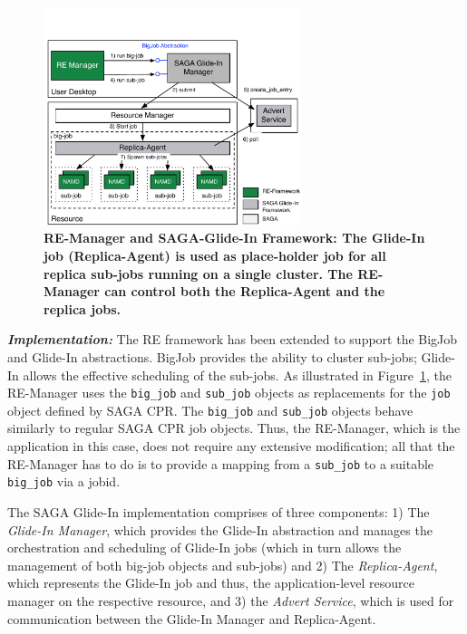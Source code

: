 \documentclass{rspublic}
\newcommand{\replicaagent}[1]{Replica-Agent }
\newcommand{\remanager}[1]{RE-Manager }
\begin{document}
\begin{figure}[t]
	    \begin{center}  
	      \includegraphics[width=0.67\textwidth]{re_bigjob_interactions_v2}
	      \caption{\footnotesize \bf RE-Manager and SAGA-Glide-In Framework:
	        The Glide-In job (Replica-Agent) is used as place-holder job
	        for all replica sub-jobs running on a single cluster. The
	        \remanager\ can control both the \replicaagent\ and the replica
	        jobs.\vspace*{-1em}}
	        \label{fig:remdmanager_v1.1}   
	    \end{center}
\end{figure}

{\noindent \it \bf Implementation:} The RE framework has been
extended to support the BigJob and Glide-In abstractions.
BigJob provides the ability to cluster sub-jobs; Glide-In allows the
effective scheduling of the sub-jobs.  As illustrated in
Figure~\ref{fig:remdmanager_v1.1}, the RE-Manager uses the
\texttt{big\_job} and \texttt{sub\_job} objects as replacements for the
\texttt{job} object defined by SAGA CPR.  The \texttt{big\_job} and
\texttt{sub\_job} objects behave similarly to regular SAGA CPR job
objects. Thus, the RE-Manager, which is the application in this case,
does not require any extensive modification; 
all that the RE-Manager has to do is to provide a mapping 
from a \texttt{sub\_job} to a suitable \texttt{big\_job} via a jobid.

The SAGA Glide-In implementation comprises of three components: 1) The
\emph{Glide-In Manager}, which provides the Glide-In abstraction and
manages the orchestration and scheduling 
of Glide-In jobs (which in turn allows
the management of both big-job objects and sub-jobs) and 2) The
\emph{Replica-Agent}, which represents the Glide-In job and thus, the
application-level resource manager on the respective resource, and 3)
the \emph{Advert Service}, which is used for communication between the
Glide-In Manager and Replica-Agent.
\end{document}
